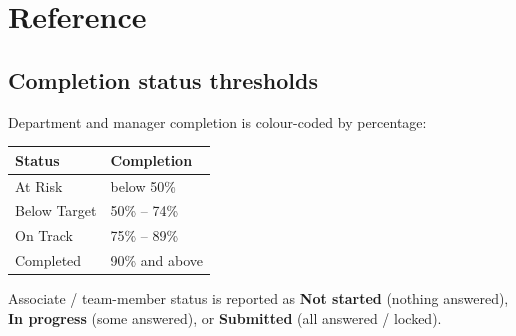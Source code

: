 \documentclass[11pt]{article}
\begin{document}
\section{Reference}
\subsection{Completion status thresholds}\label{sec:statusref}
Department and manager completion is colour-coded by percentage:
\begin{table}[H]\centering\small
\renewcommand{\arraystretch}{1.3}
\begin{tabularx}{\linewidth}{@{}lX@{}}
\toprule
\textbf{Status} & \textbf{Completion}\\
\midrule
At Risk        & below 50\%\\
Below Target   & 50\% -- 74\%\\
On Track       & 75\% -- 89\%\\
Completed      & 90\% and above\\
\bottomrule
\end{tabularx}
\end{table}
Associate / team-member status is reported as \textbf{Not started} (nothing answered),
\textbf{In progress} (some answered), or \textbf{Submitted} (all answered / locked).
\end{document}
